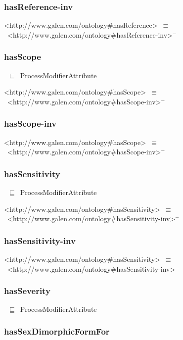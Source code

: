 \documentclass{article}
\begin{document}
\subsubsection*{hasReference-inv}

<http://www.galen.com/ontology#hasReference>~\ensuremath{\equiv}~<http://www.galen.com/ontology#hasReference-inv>\ensuremath{^-}

\subsubsection*{hasScope}

~\ensuremath{\sqsubseteq}~ProcessModifierAttribute

<http://www.galen.com/ontology#hasScope>~\ensuremath{\equiv}~<http://www.galen.com/ontology#hasScope-inv>\ensuremath{^-}

\subsubsection*{hasScope-inv}

<http://www.galen.com/ontology#hasScope>~\ensuremath{\equiv}~<http://www.galen.com/ontology#hasScope-inv>\ensuremath{^-}

\subsubsection*{hasSensitivity}

~\ensuremath{\sqsubseteq}~ProcessModifierAttribute

<http://www.galen.com/ontology#hasSensitivity>~\ensuremath{\equiv}~<http://www.galen.com/ontology#hasSensitivity-inv>\ensuremath{^-}

\subsubsection*{hasSensitivity-inv}

<http://www.galen.com/ontology#hasSensitivity>~\ensuremath{\equiv}~<http://www.galen.com/ontology#hasSensitivity-inv>\ensuremath{^-}

\subsubsection*{hasSeverity}

~\ensuremath{\sqsubseteq}~ProcessModifierAttribute

\subsubsection*{hasSexDimorphicFormFor}
\end{document}
